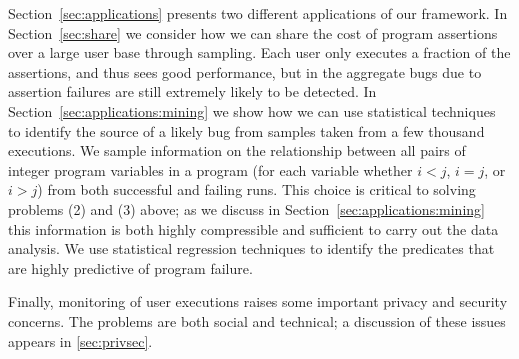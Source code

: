 Section~\ref{sec:applications} presents two different applications of
our framework.  In Section~\ref{sec:share} we consider how we can
share the cost of program assertions over a large user base through
sampling.  Each user only executes a fraction of the assertions, and
thus sees good performance, but in the aggregate bugs due to assertion
failures are still extremely likely to be detected.  In
Section~\ref{sec:applications:mining} we show how we can use
statistical techniques to identify the source of a likely bug from
samples taken from a few thousand executions.  We sample information
on the relationship between all pairs of integer program variables in
a program (for each variable whether $i < j$, $i = j$, or $i > j$)
from both successful and failing runs.  This choice is critical to
solving problems (2) and (3) above; as we discuss in Section~\ref{sec:applications:mining}
this information is both highly compressible and sufficient to
carry out the data analysis.  We use statistical
regression techniques to identify the predicates that are highly
predictive of program failure.

Finally, monitoring of user executions raises some important
privacy and security concerns.  The problems are both social and technical; 
a discussion of these issues appears in \autoref{sec:privsec}.



